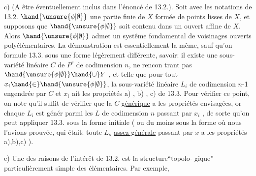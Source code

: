 c) (A être éventuellement inclus dans l'énoncé de 13.2.). Soit
avec les notations de 13.2. $\hand{\unsure{\phi|\emptyset}}$ une partie finie de $X$ formée de points
lisses de $X$, et supposons que $\hand{\unsure{\phi|\emptyset}}$ soit contenu dans un  ouvert affine
de $X$. Alors $\hand{\unsure{\phi|\emptyset}}$ admet un systême fondamental de voisinages ouverts
polyélémentaires.  La démonstration est essentiellement la même, sauf
qu'on formule 13.3. sous une forme légèrement différente, savoir: il
existe une sous-variété linéaire $C$ de $P^r$ de codimension $n$, ne rencon%
trant pas $\hand{\unsure{\phi|\emptyset}}\hand{\cup} Y$ , et telle que pour tout $x_i\hand{\in}\hand{\unsure{\phi|\emptyset}}$, la sous-variété
linéaire $L_i$ de codimension $n$-1 engendrée par $C$ et $x_i$ ait les propriétés
a) , b) , c) de 13.3. Pour vérifier ce point, on note qu'il suffit de
vérifier que la $C$ \uline{générique} a les propriétés envisagées, or  
 chaque $L_i$ est génér parmi les $L$ de codimension $n$ passant
par $x_i$ , de sorte qu'on peut appliquer 13.3. sous la forme initiale
( ou du moins sous la forme où nous l'avions prouvée, qui était: toute
$L_o$ \uline{assez générale} passant par $x$ a les propriétés a),b),c) ).

e) Une des raisons de l'intérêt de 13.2. est la structure``topolo-%
gique'' particulièrement simple des   élémentaires. Par exemple,


